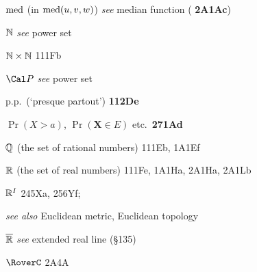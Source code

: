 $\mathop{\text{med}}\nolimits$ (in $\mathop{\text{med}}\nolimits(u,v,w)$) {\it see} median function ({\bf
2A1Ac})




\indexmedskip
{}

$\Bbb N$
{\it see} power set


$\Bbb N\times\Bbb N$ 111Fb























\indexmedskip
{}

$\Cal P$ {\it see} power set



























p.p.\ (`presque partout') {\bf 112De}

$\Pr(X>a)$, $\Pr(\pmb{X}\in E)$ etc.\ {\bf 271Ad}


\indexmedskip
{}

$\Bbb Q$ (the set of rational numbers) 111Eb, 1A1Ef





\indexmedskip
{}

$\Bbb R$ (the set of real numbers) 111Fe, 1A1Ha,
  2A1Ha, 2A1Lb


$\Bbb R^I$ 245Xa, 256Yf;  
  
  {\it see also} Euclidean metric, Euclidean topology




$\overline{\Bbb R}$ {\it see} extended real line (\S135)



$\RoverC$ 2A4A


















